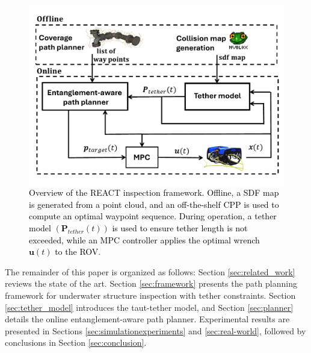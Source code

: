 %
\begin{figure}[t!]
	\centering	\includegraphics[width=1\linewidth]{EA-Planner/figures/abstract.pdf}
	  \caption{\textcolor{black}{Overview of the \ac{REACT} inspection framework. Offline, a \ac{SDF} map is generated from a point cloud, and an off-the-shelf \ac{CPP} \cite{feng2024fc} is used to compute an optimal waypoint sequence. During operation, a tether model $(\mathbf{P}_{tether}(t))$ is used  to ensure tether length is not exceeded, while an \ac{MPC} controller applies the optimal wrench $\mathbf{u}(t)$ to the \ac{ROV}}.}
    \label{fig:abstract}
\end{figure}
%







The remainder of this paper is organized as follows: Section \ref{sec:related_work} reviews the state of the art. Section \ref{sec:framework} presents the path planning framework for underwater structure inspection with tether constraints. Section \ref{sec:tether_model} introduces the taut-tether model, and Section \ref{sec:planner} details the online entanglement-aware path planner. Experimental results are presented in Sections \ref{sec:simulationexperiments} and \ref{sec:real-world}, followed by conclusions in Section \ref{sec:conclusion}.





